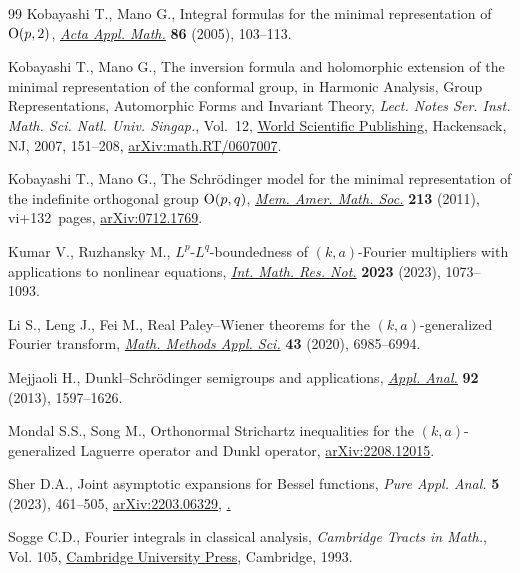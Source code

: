 \begin{thebibliography}{99}
Kobayashi T., Mano G., Integral formulas for the minimal representation of
 {${\rm O}(p,2)$}, \href{https://doi.org/10.1007/s10440-005-0464-2}{\textit{Acta Appl. Math.}} \textbf{86} (2005), 103--113.

Kobayashi T., Mano G., The inversion formula and holomorphic extension of the
 minimal representation of the conformal group, in Harmonic {A}nalysis,
 {G}roup {R}epresentations, {A}utomorphic {F}orms and {I}nvariant {T}heory,
 \textit{Lect. Notes Ser. Inst. Math. Sci. Natl. Univ. Singap.}, Vol.~12,
 \href{https://doi.org/10.1142/9789812770790_0006}{World Scientific Publishing}, Hackensack, NJ, 2007, 151--208,
 \href{https://arxiv.org/abs/math.RT/0607007}{arXiv:math.RT/0607007}.

Kobayashi T., Mano G., The {S}chr\"odinger model for the minimal representation
 of the indefinite orthogonal group {${\rm O}(p,q)$}, \href{https://doi.org/10.1090/S0065-9266-2011-00592-7}{\textit{Mem. Amer. Math.
 Soc.}} \textbf{213} (2011), vi+132~pages, \href{https://arxiv.org/abs/0712.1769}{arXiv:0712.1769}.

Kumar V., Ruzhansky M., {$L^p$}-{$L^q$}-boundedness of {$(k,a)$}-{F}ourier
 multipliers with applications to nonlinear equations, \href{https://doi.org/10.1093/imrn/rnab256}{\textit{Int. Math. Res.
 Not.}} \textbf{2023} (2023), 1073--1093.

Li S., Leng J., Fei M., Real {P}aley--{W}iener theorems for the
 {$(k,a)$}-generalized {F}ourier transform, \href{https://doi.org/10.1002/mma.6449}{\textit{Math. Methods Appl. Sci.}}
 \textbf{43} (2020), 6985--6994.

Mejjaoli H., Dunkl--{S}chr\"odinger semigroups and applications, \href{https://doi.org/10.1080/00036811.2012.692780}{\textit{Appl.
 Anal.}} \textbf{92} (2013), 1597--1626.

Mondal S.S., Song M., Orthonormal Strichartz inequalities for the
 {$(k,a)$}-generalized {L}aguerre operator and {D}unkl operator,
 \href{https://arxiv.org/abs/2208.12015}{arXiv:2208.12015}.

Sher D.A., Joint asymptotic expansions for {B}essel functions, \textit{Pure
 Appl. Anal.} \textbf{5} (2023), 461--505, \href{https://arxiv.org/abs/2203.06329}{arXiv:2203.06329},
 \href{https://doi.org/10.2140/paa.2023.5.461}.

Sogge C.D., Fourier integrals in classical analysis, \textit{Cambridge Tracts
 in Math.}, Vol. 105, \href{https://doi.org/10.1017/CBO9780511530029}{Cambridge University Press}, Cambridge, 1993.


\end{thebibliography}
